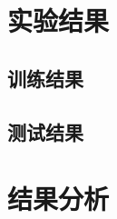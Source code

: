 \documentclass[a4paper,12pt]{ctexart} %
\begin{document}
\section{实验结果}


\subsection{训练结果}


\subsection{测试结果}


\section{结果分析}
\end{document}
